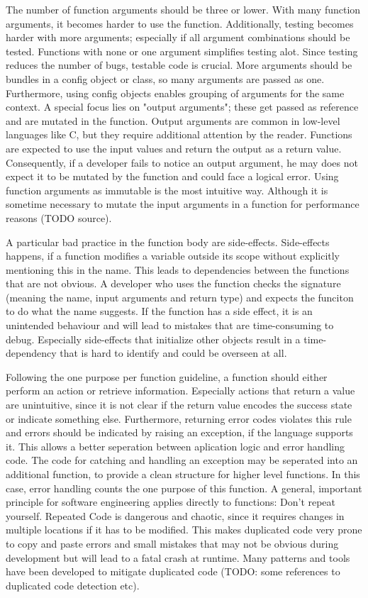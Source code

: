 The number of function arguments should be three or lower. With many function arguments, it becomes harder to use the function. Additionally, testing becomes harder with more arguments; especially if all argument combinations should be tested. Functions with none or one argument simplifies testing alot. Since testing reduces the number of bugs, testable code is crucial. 
More arguments should be bundles in a config object or class, so many arguments are passed as one. Furthermore, using config objects enables grouping of arguments for the same context.
A special focus lies on "output arguments"; these get passed as reference and are mutated in the function. Output arguments are common in low-level languages like C, but they require additional attention by the reader. Functions are expected to use the input values and return the output as a return value. Consequently, if a developer fails to notice an output argument, he may does not expect it to be mutated by the function and could face a logical error. Using function arguments as immutable is the most intuitive way. Although it is sometime necessary to mutate the input arguments in a function for performance reasons (TODO source).

A particular bad practice in the function body are side-effects. Side-effects happens, if a function modifies a variable outside its scope without explicitly mentioning this in the name. This leads to dependencies between the functions that are not obvious. A developer who uses the function checks the signature (meaning the name, input arguments and return type) and expects the funciton to do what the name suggests. If the function has a side effect, it is an unintended behaviour and will lead to mistakes that are time-consuming to debug. Especially side-effects that initialize other objects result in a time-dependency that is hard to identify and could be overseen at all.

Following the one purpose per function guideline, a function should either perform an action or retrieve information. Especially actions that return a value are unintuitive, since it is not clear if the return value encodes the success state or indicate something else.
Furthermore, returning error codes violates this rule and errors should be indicated by raising an exception, if the language supports it. This allows a better seperation between aplication logic and error handling code. The code for catching and handling an exception may be seperated into an additional function, to provide a clean structure for higher level functions. In this case, error handling counts the one purpose of this function.
A general, important principle for software engineering applies directly to functions: Don't repeat yourself. Repeated Code is dangerous and chaotic, since it requires changes in multiple locations if it has to be modified. This makes duplicated code very prone to copy and paste errors and small mistakes that may not be obvious during development but will lead to a fatal crash at runtime. Many patterns and tools have been developed to mitigate duplicated code (TODO: some references to duplicated code detection etc).


